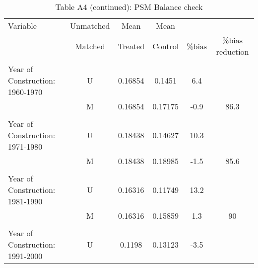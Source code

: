\documentclass[12pt]{article}
\begin{document}
\begin{table}[H]
\scriptsize
  \centering
  \caption*{Table A4 (continued): PSM Balance check}
      \begin{tabular}{lccccc}
\hline
Variable                                                                    & Unmatched & Mean    &    Mean     &        &                  \\
                                                                            & Matched   & Treated & Control & \%bias & \%bias reduction \\
\hline
                                                                            &           &         &         &        &                  \\
Year of Construction: 1960-1970                                                                   & U         & 0.16854 & 0.1451  & 6.4    &                  \\
                                                                            & M         & 0.16854 & 0.17175 & -0.9   & 86.3             \\
                                                                            &           &         &         &        &                  \\
Year of Construction: 1971-1980                                                                   & U         & 0.18438 & 0.14627 & 10.3   &                  \\
                                                                            & M         & 0.18438 & 0.18985 & -1.5   & 85.6             \\
                                                                            &           &         &         &        &                  \\
Year of Construction: 1981-1990                                                                   & U         & 0.16316 & 0.11749 & 13.2   &                  \\
                                                                            & M         & 0.16316 & 0.15859 & 1.3    & 90               \\
                                                                            &           &         &         &        &                  \\
Year of Construction: 1991-2000                                                                   & U         & 0.1198  & 0.13123 & -3.5   &                  \\

\end{tabular}
\end{table}
\end{document}
